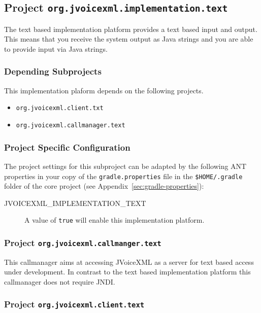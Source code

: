 \documentclass[11pt,a4paper]{article}
\begin{document}
\subsection{Project \texttt{org.jvoicexml.implementation.text}}
\label{sec:text-implemenation-platform}

The text based implementation platform provides a text based input and output.
This means that you receive the system output as Java strings and you are able
to provide input via Java strings.

\subsubsection{Depending Subprojects}

This implementation plaform depends on the following projects.
\begin{itemize}
\item \texttt{org.jvoicexml.client.txt}
\item \texttt{org.jvoicexml.callmanager.text}
\end{itemize}

\subsubsection{Project Specific Configuration}

The project settings for this subproject can be adapted by the following ANT
properties in your copy of the \texttt{gradle.properties} file in the
\texttt{\${HOME}/.gradle} folder of the core project (see 
Appendix~\ref{sec:gradle-properties}):

\begin{description}
\item[JVOICEXML\_IMPLEMENTATION\_TEXT] A value of \texttt{true} will enable this implementation
platform.
\end{description}

\subsubsection{Project \texttt{org.jvoicexml.callmanger.text}}

This callmanager aims at accessing JVoiceXML as a server for text based
access under development. In contrast to the text based implementation platform this callmanager
does not require JNDI.

\subsubsection{Project \texttt{org.jvoicexml.client.text}}
\end{document}
